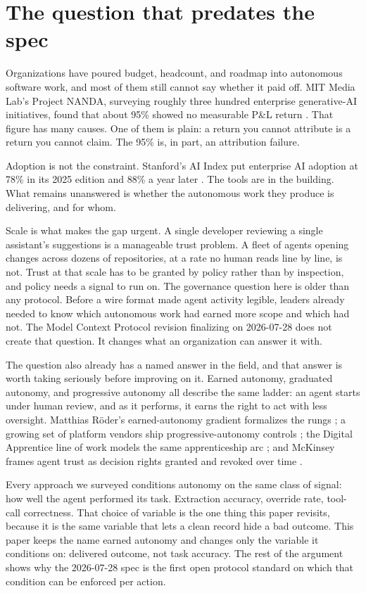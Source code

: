 \section{The question that predates the spec}

Organizations have poured budget, headcount, and roadmap into autonomous
software work, and most of them still cannot say whether it paid off. MIT Media
Lab's Project NANDA, surveying roughly three hundred enterprise generative-AI
initiatives, found that about 95\% showed no measurable P\&L return
\citep{nanda2025}. That figure has many causes. One of them is plain: a return
you cannot attribute is a return you cannot claim. The 95\% is, in part, an
attribution failure.

Adoption is not the constraint. Stanford's AI Index put enterprise AI adoption
at 78\% in its 2025 edition and 88\% a year later
\citep{stanford2025, stanford2026}. The tools are in the building. What remains
unanswered is whether the autonomous work they produce is delivering, and for
whom.

Scale is what makes the gap urgent. A single developer reviewing a single
assistant's suggestions is a manageable trust problem. A fleet of agents opening
changes across dozens of repositories, at a rate no human reads line by line, is
not. Trust at that scale has to be granted by policy rather than by inspection,
and policy needs a signal to run on. The governance question here is older than
any protocol. Before a wire format made agent activity legible, leaders already
needed to know which autonomous work had earned more scope and which had not.
The Model Context Protocol revision finalizing on 2026-07-28 does not create that
question. It changes what an organization can answer it with.

The question also already has a named answer in the field, and that answer is
worth taking seriously before improving on it. Earned autonomy, graduated
autonomy, and progressive autonomy all describe the same ladder: an agent starts
under human review, and as it performs, it earns the right to act with less
oversight. Matthias R\"{o}der's earned-autonomy gradient formalizes the rungs
\citep{roder}; a growing set of platform vendors ship progressive-autonomy
controls \citep{progressiveautonomy}; the Digital Apprentice line of work models
the same apprenticeship arc \citep{digitalapprentice}; and McKinsey frames agent
trust as decision rights granted and revoked over time \citep{mckinsey}.

Every approach we surveyed conditions autonomy on the same class of signal: how
well the agent performed its task. Extraction accuracy, override rate, tool-call
correctness. That choice of variable is the one thing this paper revisits, because
it is the same variable that lets a clean record hide a bad outcome. This paper
keeps the name earned autonomy and changes only the variable it conditions on:
delivered outcome, not task accuracy. The rest of the argument shows why the
2026-07-28 spec is the first open protocol standard on which that condition can
be enforced per action.
